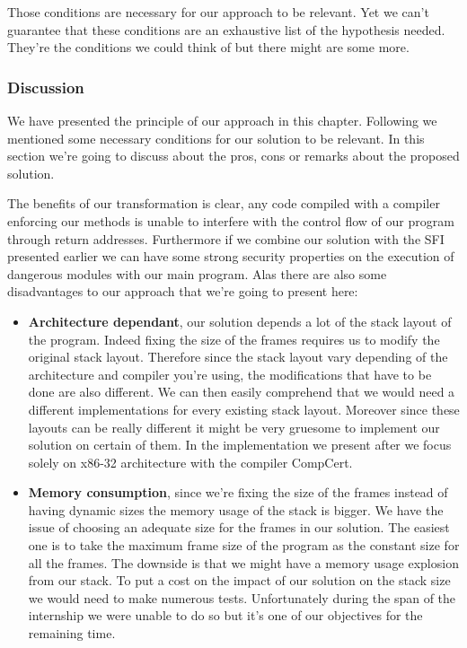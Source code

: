 \documentclass[11pt]{sdm}
\begin{document}
Those conditions are necessary for our approach to be relevant. Yet we can't guarantee that these conditions are an exhaustive list of the hypothesis needed. They're the conditions we could think of but there might are some more.

\subsubsection{Discussion}
\label{ssub:Discussion}
	We have presented the principle of our approach in this chapter. Following we mentioned some necessary conditions for our solution to be relevant. In this section we're going to discuss about the pros, cons or remarks about the proposed solution.

	The benefits of our transformation is clear, any code compiled with a compiler enforcing our methods is unable to interfere with the control flow of our program through return addresses.
	Furthermore if we combine our solution with the SFI presented earlier we can have some strong security properties on the execution of dangerous modules with our main program.
Alas there are also some disadvantages to our approach that we're going to present here:
	\begin{itemize}
		\item \textbf{Architecture dependant}, our solution depends a lot of the stack layout of the program. Indeed fixing the size of the frames requires us to modify the original stack layout. Therefore since the stack layout vary depending of the architecture and compiler you're using, the modifications that have to be done are also different. We can then easily comprehend that we would need a different implementations for every existing stack layout. Moreover since these layouts can be really different it might be very gruesome to implement our solution on certain of them.
In the implementation we present after we focus solely on x86-32 architecture with the compiler CompCert.
		\item \textbf{Memory consumption}, since we're fixing the size of the frames instead of having dynamic sizes the memory usage of the stack is bigger. We have the issue of choosing an adequate size for the frames in our solution. The easiest one is to take the maximum frame size of the program as the constant size for all the frames. The downside is that we might have a memory usage explosion from our stack. To put a cost on the impact of our solution on the stack size we would need to make numerous tests. Unfortunately during the span of the internship we were unable to do so but it's one of our objectives for the remaining time.
	\end{itemize}
\end{document}
